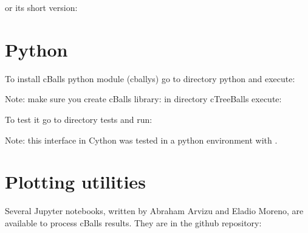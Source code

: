 \documentclass[letterpaper,10pt,english]{sphinxmanual}
\begin{document}
\begin{sphinxVerbatim}[commandchars=\\\{\}]
 
\end{sphinxVerbatim}

\sphinxAtStartPar
or its short version:

\begin{sphinxVerbatim}[commandchars=\\\{\}]
 
\end{sphinxVerbatim}


\section{Python}
\label{\detokenize{overview:python}}
\sphinxAtStartPar
To install cBalls python module (cballys) go to directory \textquotesingle{}python\textquotesingle{} and execute:

\begin{sphinxVerbatim}[commandchars=\\\{\}]
  
   
\end{sphinxVerbatim}

\sphinxAtStartPar
Note: make sure you create cBalls library: in directory cTreeBalls execute:

\begin{sphinxVerbatim}[commandchars=\\\{\}]
   
\end{sphinxVerbatim}

\sphinxAtStartPar
To test it go to directory tests and \textquotesingle{}run\textquotesingle{}:

\begin{sphinxVerbatim}[commandchars=\\\{\}]
 
\end{sphinxVerbatim}

\sphinxAtStartPar
Note: this interface in Cython was tested in a python environment with .


\section{Plotting utilities}
\label{\detokenize{overview:plotting-utilities}}
\sphinxAtStartPar
Several Jupyter notebooks, written by Abraham Arvizu and Eladio Moreno, are available to process cBalls results. They are in the github repository:
\end{document}
